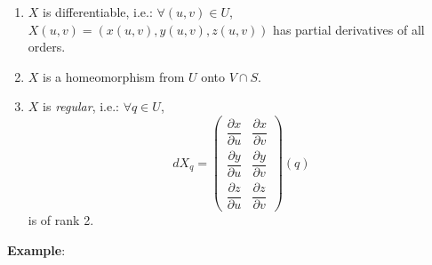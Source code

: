 \begin{enumerate}
\item $X$ is differentiable, i.e.: $\forall (u, v)\in U$, $X(u, v) = (x(u,v), y(u,v), z(u,v))$ has partial derivatives of all orders.
\item $X$ is a homeomorphism from $U$ onto $V\cap S$.
\item $X$ is \textit{regular}, i.e.: $\forall q\in U$,
\[
dX_q = \begin{pmatrix}\dfrac{\partial x}{\partial u} & \dfrac{\partial x}{\partial v}\\[2mm] \dfrac{\partial y}{\partial u} & \dfrac{\partial y}{\partial v}\\[2mm] \dfrac{\partial z}{\partial u} & \dfrac{\partial z}{\partial v}\end{pmatrix}(q)
\]
is of rank 2.
\end{enumerate}

\noindent\textbf{Example}:


